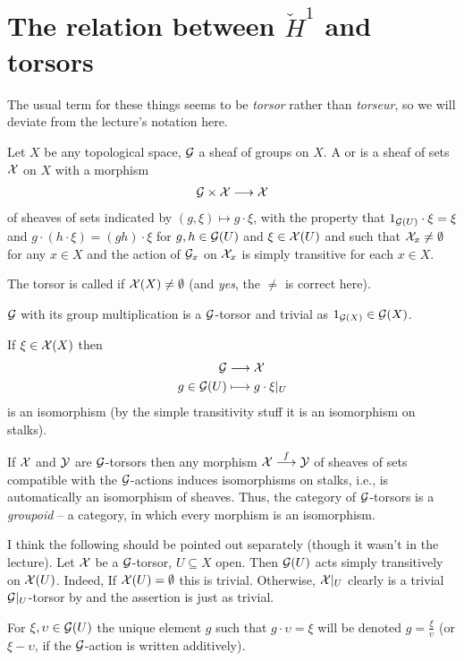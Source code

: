\documentclass[a4paper,parskip=half,numbers=enddot, DIV=12]{scrreprt}
\begin{document}
\section{The relation between \texorpdfstring{$\check{H}^1$}{H} and torsors}
The usual term for these things seems to be \emph{torsor} rather than \emph{torseur}, so we will deviate from the lecture's notation here.
\begin{defi}
	Let $X$ be any topological space, $\mathcal{G}$ a sheaf of groups on $X$. A  or  is a sheaf of sets $\mathcal{X}$ on $X$ with a morphism
	\begin{align*}
		\Gg\times \Xx\morphism\Xx
	\end{align*}
	of sheaves of sets indicated by $(g,\xi)\mapsto g\cdot \xi$, with the property that $1_{\mathcal{G}(U)}\cdot \xi=\xi$ and $g\cdot(h\cdot \xi)=(gh)\cdot \xi$ for $g,h\in\mathcal{G}(U)$ and $\xi\in\mathcal{X}(U)$ and such that $\mathcal{X}_x\neq \emptyset$ for any $x\in X$ and the action of $\mathcal{G}_x$ on $\mathcal{X}_x$ is simply transitive for each $x\in X$.
	
	The torsor is called  if $\mathcal{X}(X)\neq \emptyset$ (and \emph{yes}, the $\neq$ is correct here).
\end{defi}
\begin{example}
	$\mathcal{G}$ with its group multiplication is a $\mathcal{G}$-torsor and trivial as $1_{\mathcal{G}(X)}\in\mathcal{G}(X)$.
\end{example}
\begin{rem}
	\begin{alphanumerate}
		\item {}If $\xi\in\mathcal{X}(X)$ then 
		\begin{align*}
			\Gg&\morphism\Xx\\
			g\in\Gg(U)&\longmapsto g\cdot \xi|_U
		\end{align*}
		is an isomorphism (by the simple transitivity stuff it is an isomorphism on stalks).
		\item If $\mathcal{X}$ and $\mathcal{Y}$ are $\mathcal{G}$-torsors then any morphism $\Xx\morphism[f]\Yy$ of sheaves of sets compatible with the $\mathcal{G}$-actions induces isomorphisms on stalks, i.e., is automatically an isomorphism of sheaves. Thus, the category of $\mathcal{G}$-torsors is a \emph{groupoid} -- a category, in which every morphism is an isomorphism.
		\item I think the following should be pointed out separately (though it wasn't in the lecture). Let $\mathcal{X}$ be a $\mathcal{G}$-torsor, $U\subseteq X$ open. Then $\mathcal{G}(U)$ acts simply transitively on $\mathcal{X}(U)$. Indeed, If $\mathcal{X}(U)=\emptyset$ this is trivial. Otherwise, $\mathcal{X}|_U$ clearly is a trivial $\mathcal{G}|_U$-torsor by  and the assertion is just as trivial. 
		
		For $\xi,\upsilon\in\mathcal{G}(U)$ the unique element $g$ such that $g\cdot \upsilon=\xi$ will be denoted $g=\frac{\xi}{\upsilon}$ (or $\xi-\upsilon$, if the $\mathcal{G}$-action is written additively).
	\end{alphanumerate}
\end{rem}
\end{document}
